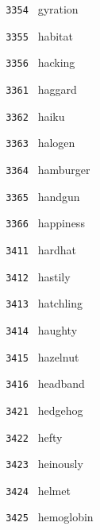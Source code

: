 \documentclass[11pt]{article}
\begin{document}
\begin{multicols}{6}
\noindent \texttt{ 3354 } \hspace{1mm} gyration  \par
\noindent \texttt{ 3355 } \hspace{1mm} habitat  \par
\noindent \texttt{ 3356 } \hspace{1mm} hacking  \par
\noindent \texttt{ 3361 } \hspace{1mm} haggard  \par
\noindent \texttt{ 3362 } \hspace{1mm} haiku  \par
\noindent \texttt{ 3363 } \hspace{1mm} halogen  \par
\noindent \texttt{ 3364 } \hspace{1mm} hamburger  \par
\noindent \texttt{ 3365 } \hspace{1mm} handgun  \par
\noindent \texttt{ 3366 } \hspace{1mm} happiness  \par
\noindent \texttt{ 3411 } \hspace{1mm} hardhat  \par
\noindent \texttt{ 3412 } \hspace{1mm} hastily  \par
\noindent \texttt{ 3413 } \hspace{1mm} hatchling  \par
\noindent \texttt{ 3414 } \hspace{1mm} haughty  \par
\noindent \texttt{ 3415 } \hspace{1mm} hazelnut  \par
\noindent \texttt{ 3416 } \hspace{1mm} headband  \par
\noindent \texttt{ 3421 } \hspace{1mm} hedgehog  \par
\noindent \texttt{ 3422 } \hspace{1mm} hefty  \par
\noindent \texttt{ 3423 } \hspace{1mm} heinously  \par
\noindent \texttt{ 3424 } \hspace{1mm} helmet  \par
\noindent \texttt{ 3425 } \hspace{1mm} hemoglobin  \par

\end{multicols}
\end{document}
